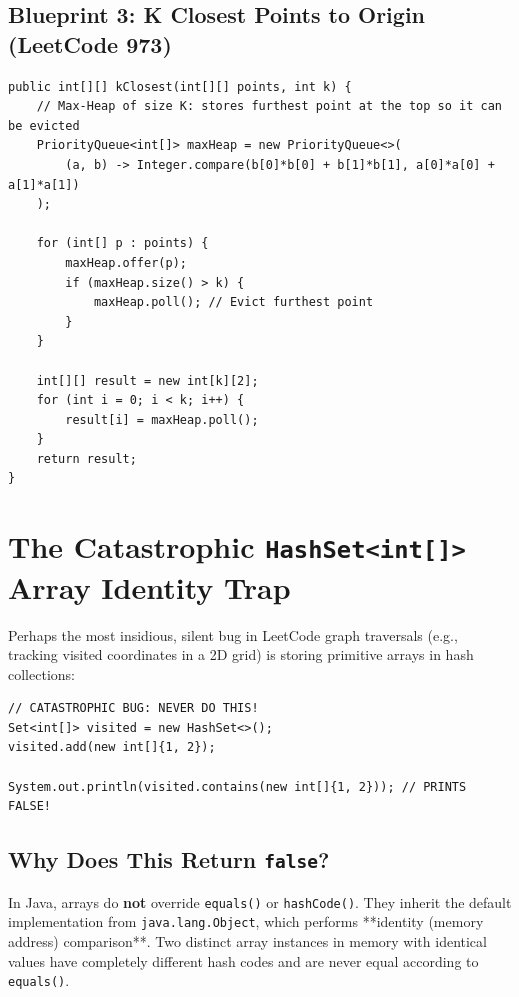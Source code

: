 \documentclass[10pt,journal,compsoc,onecolumn]{IEEEtran}
\begin{document}
\subsection{Blueprint 3: K Closest Points to Origin (LeetCode 973)}
\begin{verbatim}
public int[][] kClosest(int[][] points, int k) {
    // Max-Heap of size K: stores furthest point at the top so it can be evicted
    PriorityQueue<int[]> maxHeap = new PriorityQueue<>(
        (a, b) -> Integer.compare(b[0]*b[0] + b[1]*b[1], a[0]*a[0] + a[1]*a[1])
    );

    for (int[] p : points) {
        maxHeap.offer(p);
        if (maxHeap.size() > k) {
            maxHeap.poll(); // Evict furthest point
        }
    }

    int[][] result = new int[k][2];
    for (int i = 0; i < k; i++) {
        result[i] = maxHeap.poll();
    }
    return result;
}
\end{verbatim}

\section{The Catastrophic \texttt{HashSet<int[]>} Array Identity Trap}
\label{sec:array_identity_trap}

Perhaps the most insidious, silent bug in LeetCode graph traversals (e.g., tracking visited coordinates in a 2D grid) is storing primitive arrays in hash collections:

\begin{verbatim}
// CATASTROPHIC BUG: NEVER DO THIS!
Set<int[]> visited = new HashSet<>();
visited.add(new int[]{1, 2});

System.out.println(visited.contains(new int[]{1, 2})); // PRINTS FALSE!
\end{verbatim}

\subsection{Why Does This Return \texttt{false}?}
In Java, arrays do \textbf{not} override \texttt{equals()} or \texttt{hashCode()}. They inherit the default implementation from \texttt{java.lang.Object}, which performs **identity (memory address) comparison**. Two distinct array instances in memory with identical values have completely different hash codes and are never equal according to \texttt{equals()}.
\end{document}
